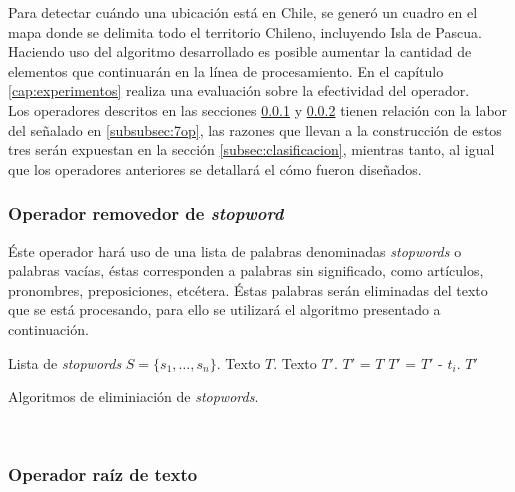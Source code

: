 Para detectar cuándo una ubicación está en Chile, se generó un cuadro en el mapa donde se delimita todo el territorio Chileno, incluyendo Isla de Pascua.\\

Haciendo uso del algoritmo desarrollado es posible aumentar la cantidad de elementos que continuarán en la línea de procesamiento. En el capítulo \ref{cap:experimentos} realiza una evaluación sobre la efectividad del operador.\\

Los operadores descritos en las secciones \ref{subsubsec:5op} y \ref{subsubsec:6op} tienen relación con la labor del señalado en \ref{subsubsec:7op}, las razones que llevan a la construcción de estos tres serán expuestan en la sección \ref{subsec:clasificacion}, mientras tanto, al igual que los operadores anteriores se detallará el cómo fueron diseñados.

\subsubsection{Operador removedor de \textit{stopword}}
\label{subsubsec:5op}

Éste operador hará uso de una lista de palabras denominadas \textit{stopwords} o palabras vacías, éstas corresponden a palabras sin significado, como artículos, pronombres, preposiciones, etcétera. Éstas palabras serán eliminadas del texto que se está procesando, para ello se utilizará el algoritmo presentado a continuación.\\

\begin{algorithm}[H]
	\begin{algorithmic}
		\REQUIRE Lista de \textit{stopwords} $S=\{s_{1}, \dots, s_{n} \}$.
		\REQUIRE Texto $T$.
		\ENSURE Texto $T'$.
		\STATE $T'$ = $T$
			\STATE $T'$ = $T'$ - $t_{i}$. 
			\ENDIF
		\ENDFOR
		\RETURN $T'$
	\end{algorithmic}
	\caption{Algoritmos de eliminiación de \textit{stopwords}.}
	\label{alg:stopwords}
\end{algorithm}\vphantom\\

\subsubsection{Operador raíz de texto}
\label{subsubsec:6op}

